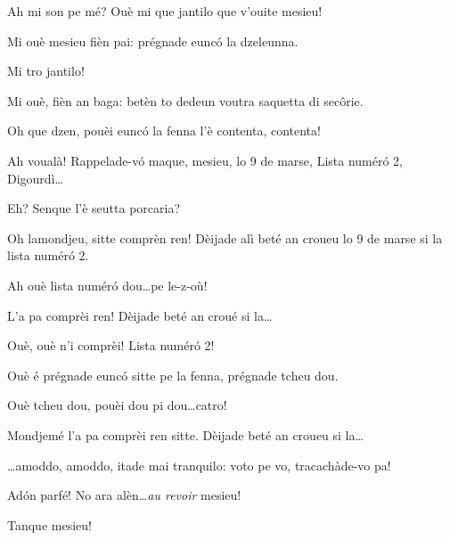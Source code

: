 \begin{drama}
\Pompiolenspeaks Ah mi son pe mé? Ouè mi que jantilo que v'ouite mesieu!

\Marcospeaks {} Mi ouè mesieu fièn pai: prégnade eunc\'o la dzeleunna.

\Pompiolenspeaks Mi tro jantilo! 

\Cimaspeaks Mi ouè, fièn an baga: betèn to dedeun  voutra saquetta di sec\^orie.


\Pompiolenspeaks Oh que dzen, pouèi eunc\'o la fenna l'è contenta, contenta!

\Cimaspeaks Ah voualà! Rappelade-v\'o maque, mesieu, lo 9 de marse, Lista num\'er\'o 2, Digourdì\ldots

\Pompiolenspeaks Eh? Senque l'è seutta porcaria?

\Cimaspeaks {} Oh lamondjeu, sitte comprèn ren!  Dèijade alì beté an croueu lo 9 de marse si la lista num\'er\'o 2.

\Pompiolenspeaks Ah ouè lista num\'er\'o dou\ldots pe le-z-où!

\Cimaspeaks {} L'a pa comprèi ren!  Dèijade beté an croué si la\ldots

\Pompiolenspeaks {} Ouè, ouè n'i comprèi! Lista num\'er\'o 2!


\Cimaspeaks Ouè é prégnade eunc\'o sitte pe la fenna, prégnade tcheu dou.

\Pompiolenspeaks{} Ouè tcheu dou, pouèi dou pi dou\ldots catro!

\Cimaspeaks {} Mondjemé l'a pa comprèi ren sitte.  Dèijade beté an croueu si la\ldots

\Pompiolenspeaks \ldots amoddo, amoddo, itade mai tranquilo: voto pe vo, tra\-ca\-chà\-de-vo pa!

\Marcospeaks Ad\'on parfé! No ara alèn\ldots \textit{au revoir} mesieu!

\Cimaspeaks Tanque mesieu!




\end{drama}
